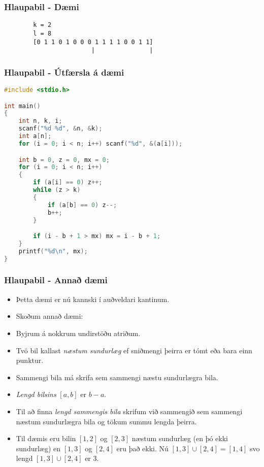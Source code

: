 \documentclass{beamer}
\begin{document}
\begin{frame}[fragile]
	\frametitle{Hlaupabil - Dæmi}
\begin{verbatim}
        k = 2
        l = 8
        [0 1 1 0 1 0 0 0 1 1 1 1 0 0 1 1]
                        |               |
\end{verbatim}
\end{frame}

\begin{frame}[fragile]
	\frametitle{Hlaupabil - Útfærsla á dæmi}
	\tiny
	\begin{lstlisting}[language=C]
#include <stdio.h>

int main()
{
	int n, k, i;
	scanf("%d %d", &n, &k);
	int a[n];
	for (i = 0; i < n; i++) scanf("%d", &(a[i]));

	int b = 0, z = 0, mx = 0;
	for (i = 0; i < n; i++)
	{
		if (a[i] == 0) z++;
		while (z > k)
		{
			if (a[b] == 0) z--;
			b++;
		}

		if (i - b + 1 > mx) mx = i - b + 1;
	}
	printf("%d\n", mx);
}
	\end{lstlisting}
\end{frame}

\begin{frame}
	\frametitle{Hlaupabil - Annað dæmi}
	\begin{itemize}
			\item<1-> Þetta dæmi er nú kannski í auðveldari kantinum.
			\item<2-> Skoðum annað dæmi:
			\item<3-> Byjrum á nokkrum undirstöðu atriðum.
			\item<4-> Tvö bil kallast \emph{næstum sundurlæg} ef sniðmengi þeirra er tómt eða bara einn punktur.
			\item<5-> Sammengi bila má skrifa sem sammengi næstu sundurlægra bila.
			\item<6-> \emph{Lengd bilsins} $[a, b]$ er $b - a$.
			\item<7-> Til að finna \emph{lengd sammengis bila} skrifum við sammengið sem sammengi næstum sundurlægra bila
				og tökum summu lengda þeirra.
			\item<8-> Til dæmis eru bilin $[1, 2]$ og $[2, 3]$ næstum sundurlæg (en þó ekki sundurlæg) en 
				$[1, 3]$ og $[2, 4]$ eru það ekki. Nú $[1, 3] \cup [2, 4] = [1, 4]$ svo lengd 
				$[1, 3] \cup [2, 4]$ er $3$.
		\end{itemize}
\end{frame}
\end{document}
